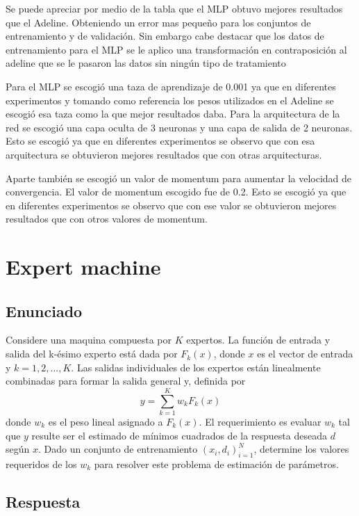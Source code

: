 \documentclass{article}
\theoremstyle{mytheoremstyle}
\theoremstyle{mytheoremstyle}
\theoremstyle{myproblemstyle}
\begin{document}
Se puede apreciar por medio de la tabla que el MLP obtuvo mejores resultados que el Adeline. Obteniendo un error mas pequeño para los conjuntos de entrenamiento y de validación. Sin embargo cabe destacar que los datos de entrenamiento para el MLP se le aplico una transformación en contraposición al adeline que se le pasaron las datos sin ningún tipo de tratamiento

Para el MLP se escogió una taza de aprendizaje de 0.001 ya que en diferentes experimentos y tomando como referencia los pesos utilizados en el Adeline se escogió esa taza como la que mejor resultados daba. Para la arquitectura de la red se escogió una capa oculta de 3 neuronas y una capa de salida de 2 neuronas. Esto se escogió ya que en diferentes experimentos se observo que con esa arquitectura se obtuvieron mejores resultados que con otras arquitecturas.

Aparte también se escogió un valor de momentum para aumentar la velocidad de convergencia. El valor de momentum escogido fue de 0.2. Esto se escogió ya que en diferentes experimentos se observo que con ese valor se obtuvieron mejores resultados que con otros valores de momentum.


\section{Expert machine}

\subsection{Enunciado}

Considere una maquina compuesta por $K$ expertos. La función de entrada y salida del k-ésimo experto está dada por $F_k(x)$, donde $x$ es el vector de entrada y $k = 1,2, ... , K$. Las salidas individuales de los expertos están linealmente combinadas para formar la salida general y, definida por
\begin{equation*}
  y = \sum_{k=1}^{K}w_kF_k(x)
\end{equation*}
donde $w_k$ es el peso lineal asignado a $F_k(x)$. El requerimiento es evaluar $w_k$ tal que $y$ resulte ser el estimado de mínimos cuadrados de la respuesta deseada $d$ según $x$. Dado un conjunto de entrenamiento ${(x_i, d_i)}_{i=1}^N$, determine los valores requeridos de los $w_k$ para resolver este problema de estimación de parámetros.

\subsection{Respuesta}
\end{document}
